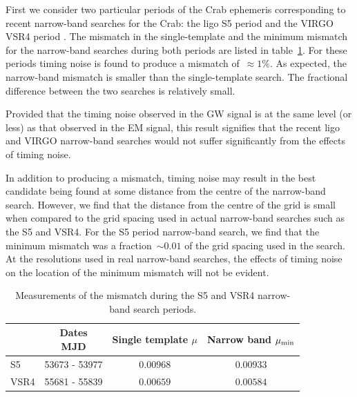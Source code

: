 \documentclass[../full_thesis/full_thesis.tex]{subfiles}
\begin{document}
First we consider two particular periods of the Crab ephemeris corresponding to
recent narrow-band searches for the Crab: the ligo S5 period \citep{ligo2008}
and the VIRGO VSR4 period \citep{ligo2015}. The mismatch in the single-template
and the minimum mismatch for the narrow-band searches during both periods are
listed in table~\ref{tab: Results}. For these periods timing noise is
found to produce a mismatch of~$\approx 1\%$. As expected, the narrow-band
mismatch is smaller than the single-template search. The fractional difference
between the two searches is relatively small.

Provided that the timing noise observed in the GW signal is at the same level
(or less) as that observed in the EM signal, this result signifies that the
recent ligo and VIRGO narrow-band searches would not suffer significantly
from the effects of timing noise.

In addition to producing a mismatch, timing noise may result in the best
candidate being found at some distance from the centre of the narrow-band
search.  However, we find that the distance from the centre of the grid is
small when compared to the grid spacing used in actual narrow-band searches
such as the S5 and VSR4.  For the S5 period narrow-band search, we find that
the minimum mismatch was a fraction~$\sim 0.01$ of the grid spacing used in the
\citet{ligo2008} search.  At the resolutions used in real narrow-band searches,
the effects of timing noise on the location of the minimum mismatch will not be
evident.

\begingroup
\small
\begin{table}[ht]
\centering
\begin{tabular}{lccc}
    &
    \specialcell{Dates \\ MJD} &
    \specialcell{Single  template \\ $\mu$} &
    \specialcell{Narrow band \\ $\mu_{\mathrm{min}}$} \\ \hline
S5 & 53673 - 53977 & $0.00968$ & $0.00933$ \\
VSR4 & 55681 - 55839 & $0.00659$ & $0.00584$ \\
\end{tabular}
\caption{Measurements of the mismatch during the S5 and VSR4 narrow-band search
         periods.}
\label{tab: Results}
\end{table}
\endgroup
\end{document}
